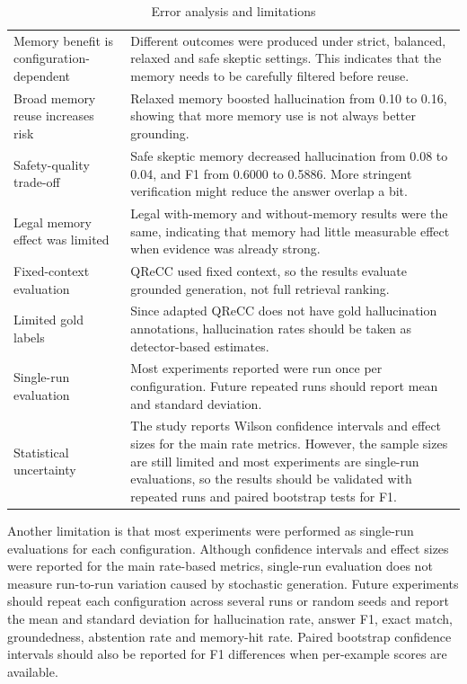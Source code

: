 \begin{table}[H]
\centering
\caption{Error analysis and limitations}
\label{tab:error-limitations}
\small
\begin{tabularx}{\textwidth}{P{0.28\textwidth} Y}
\toprule
{} &  \\
\midrule
Memory benefit is configuration-dependent & Different outcomes were produced under strict, balanced, relaxed and safe skeptic settings. This indicates that the memory needs to be carefully filtered before reuse. \\
Broad memory reuse increases risk & Relaxed memory boosted hallucination from 0.10 to 0.16, showing that more memory use is not always better grounding. \\
Safety-quality trade-off & Safe skeptic memory decreased hallucination from 0.08 to 0.04, and F1 from 0.6000 to 0.5886. More stringent verification might reduce the answer overlap a bit. \\
Legal memory effect was limited & Legal with-memory and without-memory results were the same, indicating that memory had little measurable effect when evidence was already strong. \\
Fixed-context evaluation & QReCC used fixed context, so the results evaluate grounded generation, not full retrieval ranking. \\
Limited gold labels & Since adapted QReCC does not have gold hallucination annotations, hallucination rates should be taken as detector-based estimates. \\
Single-run evaluation & Most experiments reported were run once per configuration. Future repeated runs should report mean and standard deviation. \\
Statistical uncertainty & The study reports Wilson confidence intervals and effect sizes for the main rate metrics. However, the sample sizes are still limited and most experiments are single-run evaluations, so the results should be validated with repeated runs and paired bootstrap tests for F1. \\
\bottomrule
\end{tabularx}
\end{table}

Another limitation is that most experiments were performed as single-run evaluations for each configuration. Although confidence intervals and effect sizes were reported for the main rate-based metrics, single-run evaluation does not measure run-to-run variation caused by stochastic generation. Future experiments should repeat each configuration across several runs or random seeds and report the mean and standard deviation for hallucination rate, answer F1, exact match, groundedness, abstention rate and memory-hit rate. Paired bootstrap confidence intervals should also be reported for F1 differences when per-example scores are available.
